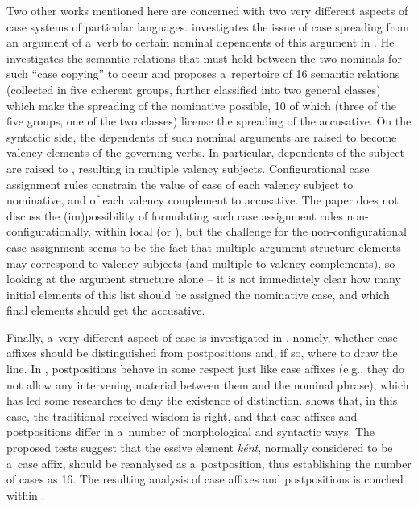 \documentclass[output=paper
 	        ,biblatex
                ,babelshorthands
                ,newtxmath
                ,draftmode
                ,colorlinks, citecolor=brown
]{langscibook}
\begin{document}
\begin{exe}
\begin{xlist}
\begin{exe}
\begin{xlist}
Two other works mentioned here are concerned with two very different aspects of case systems of
particular languages.  \citet{ryu:13} investigates the issue of case spreading from an argument of
a~verb to certain nominal dependents of this argument in .  He investigates the semantic
relations that must hold between the two nominals for such “case copying” to occur and proposes
a~repertoire of 16 semantic relations (collected in five coherent groups, further classified into
two general classes) which make the spreading of the nominative possible, 10 of which (three of the
five groups, one of the two classes) license the spreading of the accusative.  On the syntactic
side, the dependents of such nominal arguments are raised to become valency elements of the
governing verbs.  In particular, dependents of the subject are raised to  , resulting in multiple valency subjects.
  Configurational
case assignment rules constrain the value of case of each valency subject to nominative, and of each
valency complement to accusative.  The paper does not discuss the (im)possibility of formulating
such case assignment rules non-configurationally, within local  (or ), but
the challenge for the non-configurational case assignment seems to be the fact that multiple
argument structure elements may correspond to valency subjects (and multiple to valency
complements), so – looking at the argument structure alone – it is not immediately clear how many
initial elements of this list should be assigned the nominative case, and which final elements
should get the accusative.

Finally, a~very different aspect of  case is investigated in \citet{thui:11}, namely,
whether case affixes should be distinguished from postpositions and, if so, where to draw the line.
In , postpositions behave in some respect just like case affixes (e.g., they do not
allow any intervening material between them and the nominal phrase), which has led some researches
to deny the existence of  distinction.  \citet{thui:11} shows that, in this case, the
traditional received wisdom is right, and that case affixes and postpositions differ in a~number of
morphological and syntactic ways.  The proposed tests suggest that the essive element
\emph{k{\'e}nt}, normally considered to be a~case affix, should be reanalysed as a~postposition,
thus establishing the number of  cases as 16.  The resulting analysis of
 case affixes and postpositions is couched within  \citep{BS2012a-ed}.


\end{xlist}
\end{exe}
\end{xlist}
\end{exe}
\end{document}
